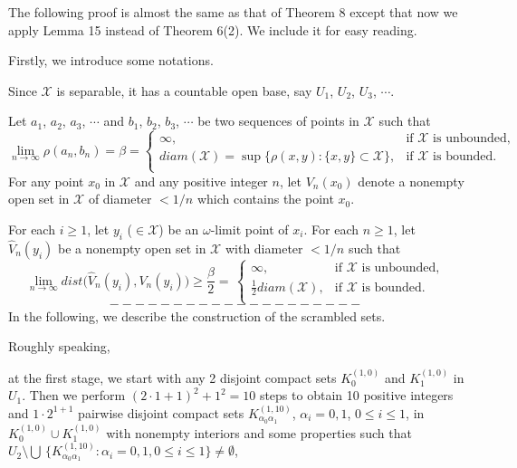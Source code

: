 \documentclass[12pt]{article}
\newcommand{\al}{\alpha}
\begin{document}
The following proof is almost the same as that of Theorem 8 except that now we apply Lemma 15 instead of Theorem 6(2).  We include it for easy reading.

Firstly, we introduce some notations.  

Since $\mathcal X$ is separable, it has a countable open base, say $U_1$, $U_2$, $U_3$, $\cdots$.  

Let $a_1$, $a_2$, $a_3$, $\cdots$ and $b_1$, $b_2$, $b_3$, $\cdots$ be two sequences of points in $\mathcal X$ such that
$$
\lim_{n \to \infty} \rho(a_n, b_n) = \beta = \begin{cases}
         \infty, & \text{if $\mathcal X$ is unbounded}, \\
         diam(\mathcal X) = \sup \big\{ \rho(x, y) : \{ x, y \} \subset \mathcal X \big\}, & \text{if $\mathcal X$ is bounded}. \\
         \end{cases}
$$ 
\indent For any point $x_0$ in $\mathcal X$ and any positive integer $n$, let $V_n(x_0)$ denote a nonempty open set in $\mathcal X$ of diameter $< 1/n$ which contains the point $x_0$.
 
For each $i \ge 1$, let $y_i$ ($\in \mathcal X$) be an $\omega$-limit point of $x_i$.  For each $n \ge 1$, let $\widehat V_n(y_i)$ be a nonempty open set in $\mathcal X$ with diameter $< 1/n$ such that 
$$
\lim_{n \to \infty} dist\big(\widehat V_n(y_i), V_n(y_i)\big) \ge \frac \beta2 = \, \begin{cases}
                    \infty, & \text{if $\mathcal X$ is unbounded}, \\
                    \frac 12diam(\mathcal X), & \text{if $\mathcal X$ is bounded}. \\
                    \end{cases}
$$
$$--------------------$$
\indent In the following, we describe the construction of the scrambled sets.

Roughly speaking, 

at the first stage, we start with any 2 disjoint compact sets $K_0^{(1,0)}$ and $K_1^{(1,0)}$ in $U_1$.  Then we perform $(2 \cdot 1 +1)^2 + 1^2 = 10$ steps to obtain 10 positive integers and $1 \cdot 2^{1+1}$ pairwise disjoint compact sets $K_{\al_0\al_1}^{(1,10)}$, $\al_i = 0, 1$, $0 \le i \le 1$, in $K_0^{(1,0)} \cup K_1^{(1,0)}$ with nonempty interiors and some properties such that $U_2 \setminus \bigcup \, \{ K_{\al_0\al_1}^{(1,10)}: \al_i = 0, 1, 0 \le i \le 1 \} \ne \emptyset$,  
\end{document}

